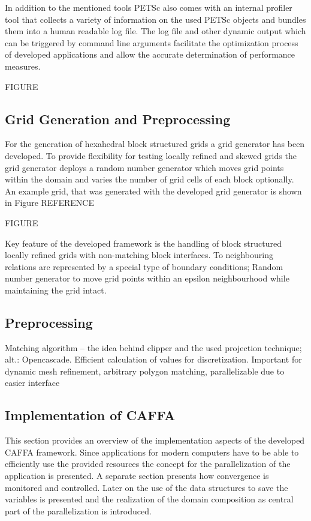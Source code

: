 In addition to the mentioned tools PETSc also comes with an internal profiler tool that collects a variety of information on the used PETSc objects and bundles them into a human readable log file. The log file and other dynamic output which can be triggered by command line arguments facilitate the optimization process of developed applications and allow the accurate determination of performance measures.

FIGURE

\subsection{Grid Generation and Preprocessing}

For the generation of hexahedral block structured grids a grid generator has been developed. To provide flexibility for testing locally refined and skewed grids the grid generator deploys a random number generator which moves grid points within the domain and varies the number of grid cells of each block optionally. An example grid, that was generated with the developed grid generator is shown in Figure REFERENCE

FIGURE

Key feature of the developed framework is the handling of block structured locally refined grids with non-matching block interfaces. To neighbouring relations are represented by a special type of boundary conditions; Random number generator to move grid points within an epsilon neighbourhood while maintaining the grid intact. 

\subsection{Preprocessing}
Matching algorithm -- the idea behind clipper and the used projection technique; alt.: Opencascade. Efficient calculation of values for discretization. Important for dynamic mesh refinement, arbitrary polygon matching, parallelizable due to easier interface

\subsection{Implementation of CAFFA}

This section provides an overview of the implementation aspects of the developed CAFFA framework. Since applications for modern computers have to be able to efficiently use the provided resources the concept for the parallelization of the application is presented. A separate section presents how convergence is monitored and controlled. Later on the use of the data structures to save the variables is presented and the realization of the domain composition as central part of the parallelization is introduced.

